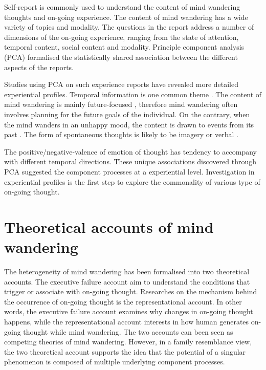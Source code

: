 Self-report is commonly used to understand the content of mind wandering thoughts and on-going experience. The content of mind wandering has a wide variety of topics and modality. The questions in the report address a number of dimensions of the on-going experience, ranging from the state of attention, temporal content, social content and modality. Principle component analysis (PCA) formalised the statistically shared association between the different aspects of the reports. 

Studies using PCA on such experience reports have revealed more detailed experiential profiles. Temporal information is one common theme \cite{RubyFP2013,RubyPlos2013}. The content of mind wandering is mainly future-focused \cite{Baird2011}, therefore mind wandering often involves planning for the future goals of the individual. On the contrary, when the mind wanders in an unhappy mood, the content is drawn to events from its past \cite{Smallwood2011}. The form of spontaneous thoughts is likely to be imagery or verbal \cite{Gorgolewski2014,Smallwood2016}. 

The positive/negative-valence of emotion of thought has tendency to accompany with different temporal directions. These unique associations discovered through PCA suggested the component processes at a experiential level. Investigation in experiential profiles is the first step to explore the commonality of various type of on-going thought. 


\section{Theoretical accounts of mind wandering}
\label{ch:intro:accounts}

The heterogeneity of mind wandering has been formalised into two theoretical accounts. The executive failure account aim to understand the conditions that trigger or associate with on-going thought. Researches on the mechanism behind the occurrence of on-going thought is the representational account. In other words, the executive failure account examines why changes in on-going thought happens, while the representational account interests in how human generates on-going thought while mind wandering. The two accounts can been seen as competing theories of mind wandering. However, in a family resemblance view, the two theoretical account supports the idea that the potential of a singular phenomenon is composed of multiple underlying component processes. 
